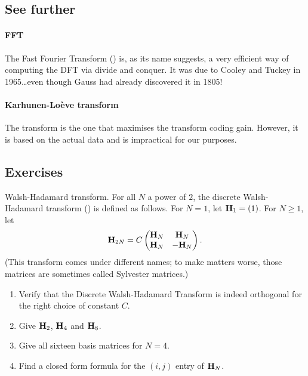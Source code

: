 \documentclass[a4paper, 11pt, openany]{book}
\begin{document}
\subsection{See further}

\paragraph{FFT} The Fast Fourier Transform () is, as its name suggests, a very efficient way of computing the DFT via divide and conquer. It was due to Cooley and Tuckey in 1965\dots even though Gauss had already discovered it in 1805!


\paragraph{Karhunen-Lo\`eve transform}
The  transform is the one that maximises the transform coding gain. However, it is based on the actual data and is impractical for our purposes.













\subsection{Exercises}

\begin{exercise} \label{exercise:Walsh-Hadamard}
Walsh-Hadamard transform. For all $N$ a power of $2$, the discrete Walsh-Hadamard transform () is defined as follows. For $N = 1$, let ${\bf H}_1 = (1)$. For $N \ge 1$, let
\[
    {\bf H}_{2N} = C \begin{pmatrix}
    {\bf H}_N & {\bf H}_N\\
    {\bf H}_N & - {\bf H}_N
    \end{pmatrix}.
\]
(This transform comes under different names; to make matters worse, those matrices are sometimes called Sylvester matrices.)
\begin{enumerate}
    \item Verify that the Discrete Walsh-Hadamard Transform is indeed orthogonal for the right choice of constant $C$.

    \item Give ${\bf H}_2$, ${\bf H}_4$ and ${\bf H}_8$.

    \item Give all sixteen basis matrices for $N = 4$.

    \item Find a closed form formula for the $(i,j)$ entry of ${\bf H}_N$.
\end{enumerate}
\end{exercise}
\end{document}
